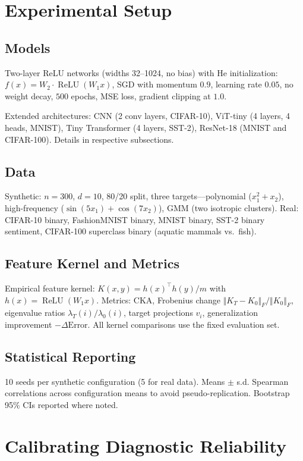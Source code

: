 \documentclass[twoside,11pt]{article}
\newcommand{\DK}{{\Vert K_{T}-K_{0}\Vert_{F}/\Vert K_{0}\Vert_{F}}}
\begin{document}
\section{Experimental Setup}
\label{sec:setup}

\subsection{Models}

Two-layer ReLU networks (widths 32--1024, no bias) with He initialization: $f(x)=W_{2}\cdot\operatorname{ReLU}(W_{1}x)$, SGD with momentum $0.9$, learning rate $0.05$, no weight decay, $500$ epochs, MSE loss, gradient clipping at $1.0$.

Extended architectures: CNN (2 conv layers, CIFAR-10), ViT-tiny (4 layers, 4 heads, MNIST), Tiny Transformer (4 layers, SST-2), ResNet-18 (MNIST and CIFAR-100). Details in respective subsections.

\subsection{Data}

Synthetic: $n=300$, $d=10$, 80/20 split, three targets---polynomial ($x_1^2+x_2$), high-frequency ($\sin(5x_1)+\cos(7x_2)$), GMM (two isotropic clusters). Real: CIFAR-10 binary, FashionMNIST binary, MNIST binary, SST-2 binary sentiment, CIFAR-100 superclass binary (aquatic mammals vs.\ fish).

\subsection{Feature Kernel and Metrics}

Empirical feature kernel: $K(x,y) = h(x)^\top h(y) / m$ with $h(x)=\operatorname{ReLU}(W_1 x)$. Metrics: CKA, Frobenius change $\DK$, eigenvalue ratios $\lambda_T(i)/\lambda_0(i)$, target projections $v_i$, generalization improvement $-\Delta\text{Error}$. All kernel comparisons use the fixed evaluation set.

\subsection{Statistical Reporting}

10 seeds per synthetic configuration (5 for real data). Means $\pm$ s.d. Spearman correlations across configuration means to avoid pseudo-replication. Bootstrap 95\% CIs reported where noted.

\section{Calibrating Diagnostic Reliability}
\label{sec:results}
\end{document}
